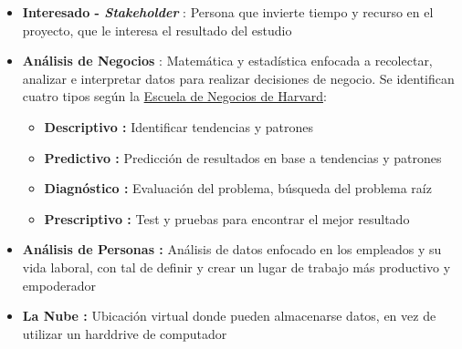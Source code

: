 \begin{itemize}
    \item {\textbf{Interesado - \textit{Stakeholder}} : Persona que invierte tiempo y recurso en el proyecto, que le interesa el resultado del estudio}
    \item {\textbf{Análisis de Negocios} : Matemática y estadística enfocada a recolectar, analizar e interpretar datos para realizar decisiones de negocio. Se identifican cuatro tipos según la \href{https://online.hbs.edu/blog/post/business-analytics-examples}{Escuela de Negocios de Harvard}:
    \begin{itemize}
        \item {\textbf{Descriptivo : }Identificar tendencias y patrones}
        \item {\textbf{Predictivo : }Predicción de resultados en base a tendencias y patrones}
        \item {\textbf{Diagnóstico : }Evaluación del problema, búsqueda del problema raíz}
        \item {\textbf{Prescriptivo : }Test y pruebas para encontrar el mejor resultado}
    \end{itemize}}
    
    \item {\textbf{Análisis de Personas : }Análisis de datos enfocado en los empleados y su vida laboral, con tal de definir y crear un lugar de trabajo más productivo y empoderador}
    
    \item {\textbf{La Nube : }Ubicación virtual donde pueden almacenarse datos, en vez de utilizar un harddrive de computador}
\end{itemize}

